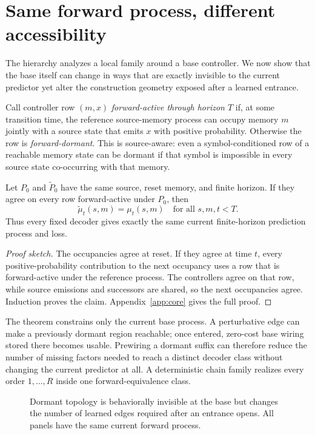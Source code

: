 \section{Same forward process, different accessibility}
\label{sec:dormant}

The hierarchy analyzes a local family around a base controller. We now show that the base itself can change in ways that are exactly invisible to the current predictor yet alter the construction geometry exposed after a learned entrance.

Call controller row $(m,x)$ \emph{forward-active through horizon $T$} if, at some transition time, the reference source-memory process can occupy memory $m$ jointly with a source state that emits $x$ with positive probability. Otherwise the row is \emph{forward-dormant}. This is source-aware: even a symbol-conditioned row of a reachable memory state can be dormant if that symbol is impossible in every source state co-occurring with that memory.

\begin{theorem}
\label{thm:forward-equivalence}
Let $P_0$ and $\widetilde P_0$ have the same source, reset memory, and finite horizon. If they agree on every row forward-active under $P_0$, then
\[
\boxed{\widetilde\mu_t(s,m)=\mu_t(s,m)\quad\text{for all }s,m,t<T.}
\]
Thus every fixed decoder gives exactly the same current finite-horizon prediction process and loss.
\end{theorem}
\begin{proof}[Proof sketch]
The occupancies agree at reset. If they agree at time $t$, every positive-probability contribution to the next occupancy uses a row that is forward-active under the reference process. The controllers agree on that row, while source emissions and successors are shared, so the next occupancies agree. Induction proves the claim. Appendix~\ref{app:core} gives the full proof.
\end{proof}

The theorem constrains only the current base process. A perturbative edge can make a previously dormant region reachable; once entered, zero-cost base wiring stored there becomes usable. Prewiring a dormant suffix can therefore reduce the number of missing factors needed to reach a distinct decoder class without changing the current predictor at all. A deterministic chain family realizes every order $1,\ldots,R$ inside one forward-equivalence class.

\begin{figure}[t]
\centering
{}
\caption{Dormant topology is behaviorally invisible at the base but changes the number of learned edges required after an entrance opens. All panels have the same current forward process.}
\label{fig:dormant-scaffold}
\end{figure}

